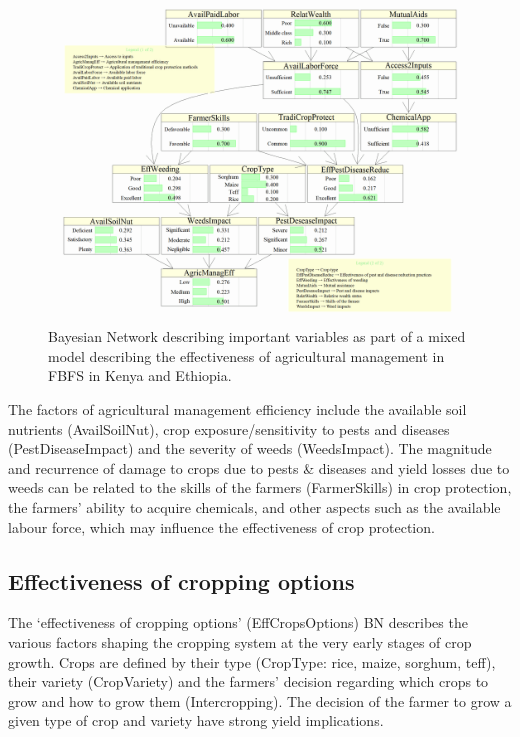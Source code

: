 \documentclass[]{elsarticle} %
\begin{document}
\begin{figure}[!h]

{\centering \includegraphics[width=1\linewidth,]{figures/Modelling_FBFS_Agricultural_management_efficiency_BNs_plot} 

}

\caption{Bayesian Network describing important variables as part of a mixed model describing the effectiveness of agricultural management in FBFS in Kenya and Ethiopia.}\label{fig:fig5}
\end{figure}

The factors of agricultural management efficiency include the available soil nutrients (AvailSoilNut), crop exposure/sensitivity to pests and diseases (PestDiseaseImpact) and the severity of weeds (WeedsImpact). The magnitude and recurrence of damage to crops due to pests \& diseases and yield losses due to weeds can be related to the skills of the farmers (FarmerSkills) in crop protection, the farmers' ability to acquire chemicals, and other aspects such as the available labour force, which may influence the effectiveness of crop protection.

\hypertarget{refs14}{%
\subsection{Effectiveness of cropping options}\label{refs14}}

The `effectiveness of cropping options' (EffCropsOptions) BN describes the various factors shaping the cropping system at the very early stages of crop growth. Crops are defined by their type (CropType: rice, maize, sorghum, teff), their variety (CropVariety) and the farmers' decision regarding which crops to grow and how to grow them (Intercropping). The decision of the farmer to grow a given type of crop and variety have strong yield implications.
\end{document}
